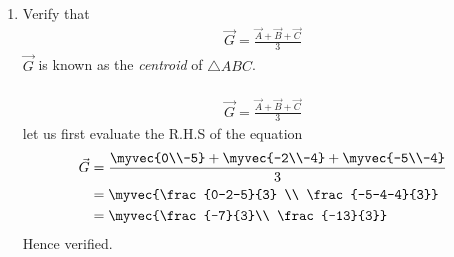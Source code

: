 \documentclass[11pt]{book}
\begin{document}
\begin{enumerate}[label=\thesection.\arabic*.,ref=\thesection.\theenumi]
\item Verify that 
		\begin{align}
			\vec{G}=\frac{\vec{A}+\vec{B}+\vec{C}}{3}
		\end{align}
$\vec{G}$ is known as the {\em centroid} of $\triangle ABC$.\\
\solution\\
\begin{align}
 \vec{G}=\frac{\vec{A}+\vec{B}+\vec{C}}{3}   
\end{align}
let us first evaluate the R.H.S of the equation
\begin{equation}
\begin{split}
\label{eq:centroid}
    \vec{G}&= \frac{\myvec{0\\-5}+\myvec{-2\\-4}+\myvec{-5\\-4}}{3}\\    
    &= \myvec{\frac{0-2-5}{3} \\ \frac{-5-4-4}{3}}\\
     &= \myvec{\frac{-7}{3}\\ \frac{-13}{3}}
\end{split}
\end{equation}
Hence verified.


\end{enumerate}
\end{document}
